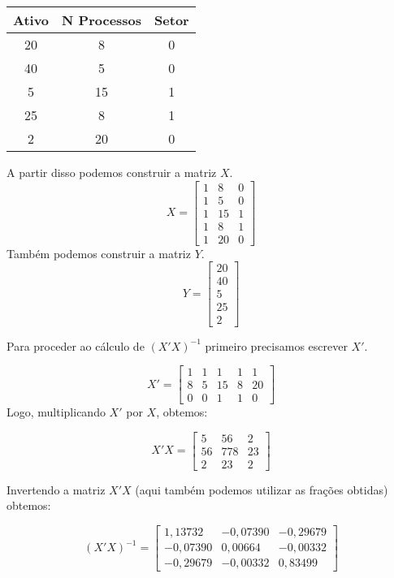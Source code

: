 \begin{center}
    \begin{tabular}{|c|c|c|}
        \hline
         Ativo & N Processos & Setor \\ \hline
         20 & 8 & 0 \\ \hline
         40 & 5 & 0 \\ \hline
         5 & 15 & 1 \\ \hline
         25 & 8 & 1 \\ \hline
         2 & 20 & 0 \\ \hline
    \end{tabular}
\end{center}

A partir disso podemos construir a matriz \(X\).
\[ X =
    \begin{bmatrix}
        1 & 8 & 0 \\
        1 & 5 & 0 \\
        1 & 15 & 1 \\
        1 & 8 & 1 \\
        1 & 20 & 0
    \end{bmatrix}
\]
Também podemos construir a matriz \(Y\).
\[ Y =
    \begin{bmatrix}
        20 \\
        40 \\
        5 \\
        25 \\
        2
    \end{bmatrix}
\]

Para proceder ao cálculo de \((X'X)^{-1}\) primeiro precisamos escrever \(X'\).

\[
    X' =
    \begin{bmatrix}
        1 & 1 & 1 & 1 & 1 \\
        8 & 5 & 15 & 8 & 20 \\
        0 & 0 & 1 & 1 & 0
    \end{bmatrix}
\]
Logo, multiplicando \(X'\) por \(X\), obtemos:

\[
    X'X =
    \begin{bmatrix}
        5 & 56 & 2 \\
        56 & 778 & 23 \\
        2 & 23 & 2
    \end{bmatrix}
\]

Invertendo a matriz \(X'X\) (aqui também podemos utilizar as frações obtidas) obtemos:

\[
    (X'X)^{-1} =
    \begin{bmatrix}
        1,13732 & -0,07390 & -0,29679 \\
        -0,07390 & 0,00664 & -0,00332 \\
        -0,29679 & -0,00332 & 0,83499
    \end{bmatrix}
\]

